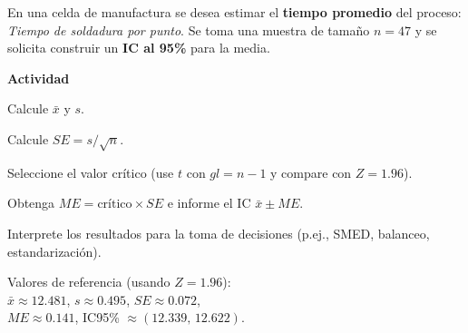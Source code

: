 \begin{ejercicio}[Tiempo de soldadura por punto (n=47)]
En una celda de manufactura se desea estimar el \textbf{tiempo promedio} del proceso: \emph{Tiempo de soldadura por punto}.
Se toma una muestra de tamaño $n=47$ y se solicita construir un \textbf{IC al 95\%} para la media.


\textbf{Actividad}
\begin{pasos}
  \item Calcule $\bar{x}$ y $s$.
  \item Calcule $SE = s/\sqrt{n}$.
  \item Seleccione el valor crítico (use $t$ con $gl=n-1$ y compare con $Z=1.96$).
  \item Obtenga $ME=\text{crítico}\times SE$ e informe el IC $\bar{x}\pm ME$.
  \item Interprete los resultados para la toma de decisiones (p.ej., SMED, balanceo, estandarización).
\end{pasos}

\begin{clave}
\noindent Valores de referencia (usando $Z=1.96$):\\
$\bar{x} \approx 12.481$, \quad $s \approx 0.495$, \quad $SE \approx 0.072$,\\
$ME \approx 0.141$, \quad IC95\% $\approx (12.339,\, 12.622)$.
\end{clave}
\end{ejercicio}
